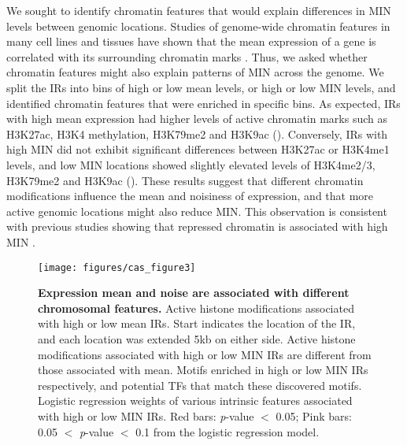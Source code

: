 We sought to identify chromatin features that would explain differences in MIN levels between genomic locations. Studies of genome-wide chromatin features in many cell lines and tissues have shown that the mean expression of a gene is correlated with its surrounding chromatin marks \cite{tencodepc_tencodepc:IntegratedEncyclopedia2012, akhtarw_vansteenselb:ChromatinPosition2013}. Thus, we asked whether chromatin features might also explain patterns of MIN across the genome. We split the IRs into bins of high or low mean levels, or high or low MIN levels, and identified chromatin features that were enriched in specific bins. As expected, IRs with high mean expression had higher levels of active chromatin marks such as H3K27ac, H3K4 methylation, H3K79me2 and H3K9ac (). Conversely, IRs with high MIN did not exhibit significant differences between H3K27ac or H3K4me1 levels, and low MIN locations showed slightly elevated levels of H3K4me2/3, H3K79me2 and H3K9ac (). These results suggest that different chromatin modifications influence the mean and noisiness of expression, and that more active genomic locations might also reduce MIN. This observation is consistent with previous studies showing that repressed chromatin is associated with high MIN \cite{faureaj_lehnerb:SystematicAnalysis2017,deyss_arkinap:OrthogonalControl2015}. 

\begin{figure}[tbp]  
    \centering
    \texttt{[image: figures/cas\_figure3]}
    \caption[Chromosomal features associated with expression mean and noise.]{%
        \textbf{Expression mean and noise are associated with different chromosomal features.}
        Active histone modifications associated with high or low mean IRs. Start indicates the location of the IR, and each location was extended 5kb on either side.
        Active histone modifications associated with high or low MIN IRs are different from those associated with mean.
        Motifs enriched in high or low MIN IRs respectively, and potential TFs that match these discovered motifs.
        Logistic regression weights of various intrinsic features associated with high or low MIN IRs. Red bars: \textit{p}-value $<$ 0.05; Pink bars: 0.05 $<$ \textit{p}-value $<$ 0.1 from the logistic regression model.  
    }
    \label{fig:cas_figure3}
\end{figure}

